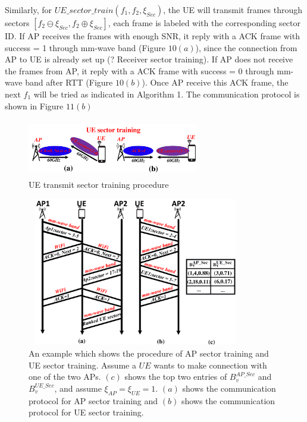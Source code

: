 \documentclass[conference]{IEEEtran}
\begin{document}
Similarly, for $UE\_sector\_train(f_{1},f_{2},\xi_{Sec})$, the UE will transmit frames through sectors $[f_{2}\ominus \xi_{Sec},f_{2}\oplus \xi_{Sec}]$, each frame is labeled with the corresponding sector ID. If AP receives the frames with enough SNR, it reply with a ACK frame with success = 1 through mm-wave band (Figure $10(a)$), since the connection from AP to UE is already set up (? Receiver sector training). If AP does not receive the frames from AP, it reply with a ACK frame with success = 0 through mm-wave band after RTT (Figure $10(b)$). Once AP receive this ACK frame, the next $f_{1}$ will be tried as indicated in Algorithm 1. The communication protocol is shown in Figure $11(b)$
 \begin{figure}
 	\centerline{\includegraphics[width=7.5cm,height=2.5cm]{ue_sector_training}}
 	\caption[U-example]{UE transmit sector training procedure}
 \end{figure}
\begin{figure}
	\centerline{\includegraphics[width=9.5cm,height=6.5cm]{comm3}}
	\caption[U-example]{An example which shows the procedure of AP sector training and UE sector training. Assume a $UE$ wants to make connection with one of the two APs. $(c)$ shows the top two entries of $B_{v}^{AP\_Sec}$ and $B_{v}^{UE\_Sec}$, and assume $\xi_{AP} = \xi_{UE} = 1$. $(a)$ shows the communication protocol for AP sector training and $(b)$ shows the communication protocol for UE sector training.}
\end{figure}
\end{document}
